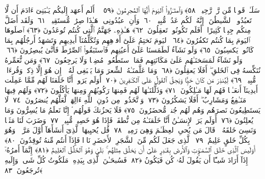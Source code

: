  سَلَـٰمٌۭ قَولًۭا مِّن رَّبٍّۢ رَّحِيمٍۢ ﴿٥٨﴾
 وَٱمتَـٰزُوا۟ ٱليَومَ أَيُّهَا ٱلمُجرِمُونَ ﴿٥٩﴾
 ۞ أَلَم أَعهَد إِلَيكُم يَـٰبَنِىٓ ءَادَمَ أَن لَّا تَعبُدُوا۟ ٱلشَّيطَٰنَ ۖ إِنَّهُۥ لَكُم عَدُوٌّۭ مُّبِينٌۭ ﴿٦٠﴾
 وَأَنِ ٱعبُدُونِى ۚ هَـٰذَا صِرَٰطٌۭ مُّستَقِيمٌۭ ﴿٦١﴾
 وَلَقَد أَضَلَّ مِنكُم جِبِلًّۭا كَثِيرًا ۖ أَفَلَم تَكُونُوا۟ تَعقِلُونَ ﴿٦٢﴾
 هَـٰذِهِۦ جَهَنَّمُ ٱلَّتِى كُنتُم تُوعَدُونَ ﴿٦٣﴾
 ٱصلَوهَا ٱليَومَ بِمَا كُنتُم تَكفُرُونَ ﴿٦٤﴾
 ٱليَومَ نَختِمُ عَلَىٰٓ أَفوَٟهِهِم وَتُكَلِّمُنَآ أَيدِيهِم وَتَشهَدُ أَرجُلُهُم بِمَا كَانُوا۟ يَكسِبُونَ ﴿٦٥﴾
 وَلَو نَشَآءُ لَطَمَسنَا عَلَىٰٓ أَعيُنِهِم فَٱستَبَقُوا۟ ٱلصِّرَٰطَ فَأَنَّىٰ يُبصِرُونَ ﴿٦٦﴾
 وَلَو نَشَآءُ لَمَسَخنَـٰهُم عَلَىٰ مَكَانَتِهِم فَمَا ٱستَطَٰعُوا۟ مُضِيًّۭا وَلَا يَرجِعُونَ ﴿٦٧﴾
 وَمَن نُّعَمِّرهُ نُنَكِّسهُ فِى ٱلخَلقِ ۖ أَفَلَا يَعقِلُونَ ﴿٦٨﴾
 وَمَا عَلَّمنَـٰهُ ٱلشِّعرَ وَمَا يَنۢبَغِى لَهُۥٓ ۚ إِن هُوَ إِلَّا ذِكرٌۭ وَقُرءَانٌۭ مُّبِينٌۭ ﴿٦٩﴾
 لِّيُنذِرَ مَن كَانَ حَيًّۭا وَيَحِقَّ ٱلقَولُ عَلَى ٱلكَـٰفِرِينَ ﴿٧٠﴾
 أَوَلَم يَرَوا۟ أَنَّا خَلَقنَا لَهُم مِّمَّا عَمِلَت أَيدِينَآ أَنعَـٰمًۭا فَهُم لَهَا مَـٰلِكُونَ ﴿٧١﴾
 وَذَلَّلنَـٰهَا لَهُم فَمِنهَا رَكُوبُهُم وَمِنهَا يَأكُلُونَ ﴿٧٢﴾
 وَلَهُم فِيهَا مَنَـٰفِعُ وَمَشَارِبُ ۖ أَفَلَا يَشكُرُونَ ﴿٧٣﴾
 وَٱتَّخَذُوا۟ مِن دُونِ ٱللَّهِ ءَالِهَةًۭ لَّعَلَّهُم يُنصَرُونَ ﴿٧٤﴾
 لَا يَستَطِيعُونَ نَصرَهُم وَهُم لَهُم جُندٌۭ مُّحضَرُونَ ﴿٧٥﴾
 فَلَا يَحزُنكَ قَولُهُم ۘ إِنَّا نَعلَمُ مَا يُسِرُّونَ وَمَا يُعلِنُونَ ﴿٧٦﴾
 أَوَلَم يَرَ ٱلإِنسَـٰنُ أَنَّا خَلَقنَـٰهُ مِن نُّطفَةٍۢ فَإِذَا هُوَ خَصِيمٌۭ مُّبِينٌۭ ﴿٧٧﴾
 وَضَرَبَ لَنَا مَثَلًۭا وَنَسِىَ خَلقَهُۥ ۖ قَالَ مَن يُحىِ ٱلعِظَـٰمَ وَهِىَ رَمِيمٌۭ ﴿٧٨﴾
 قُل يُحيِيهَا ٱلَّذِىٓ أَنشَأَهَآ أَوَّلَ مَرَّةٍۢ ۖ وَهُوَ بِكُلِّ خَلقٍ عَلِيمٌ ﴿٧٩﴾
 ٱلَّذِى جَعَلَ لَكُم مِّنَ ٱلشَّجَرِ ٱلأَخضَرِ نَارًۭا فَإِذَآ أَنتُم مِّنهُ تُوقِدُونَ ﴿٨٠﴾
 أَوَلَيسَ ٱلَّذِى خَلَقَ ٱلسَّمَـٰوَٟتِ وَٱلأَرضَ بِقَـٰدِرٍ عَلَىٰٓ أَن يَخلُقَ مِثلَهُم ۚ بَلَىٰ وَهُوَ ٱلخَلَّٰقُ ٱلعَلِيمُ ﴿٨١﴾
 إِنَّمَآ أَمرُهُۥٓ إِذَآ أَرَادَ شَيـًٔا أَن يَقُولَ لَهُۥ كُن فَيَكُونُ ﴿٨٢﴾
 فَسُبحَـٰنَ ٱلَّذِى بِيَدِهِۦ مَلَكُوتُ كُلِّ شَىءٍۢ وَإِلَيهِ تُرجَعُونَ ﴿٨٣﴾
 
